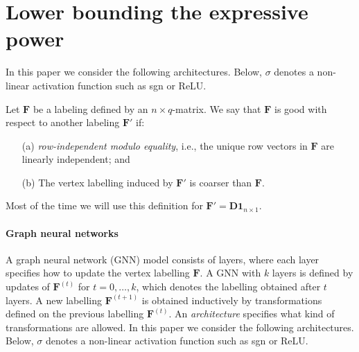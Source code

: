 


\newpage

\section{Lower bounding the expressive power}

In this paper we consider the following architectures. Below, $\sigma$ denotes a non-linear activation function such as sgn or ReLU. 

\begin{definition}\label{def:label}
Let $\mathbf{F}$ be a labeling defined by an $n\times q$-matrix. 
We say that $\mathbf{F}$ is good with respect to another labeling $\mathbf{F}'$ if:
\begin{enumerate}
\item[(a)] \textit{row-independent modulo equality}, i.e., the unique row vectors in $\mathbf{F}$ are linearly independent; and
\item[(b)] 
The vertex labelling induced by $\mathbf{F}'$ is coarser than  $\mathbf{F}$.
\end{enumerate}
\end{definition}
Most of the time we will use this definition for $\mathbf{F}' = \mathbf{D} \mathbf{1}_{n \times 1}$.
\paragraph*{Graph neural networks}
A graph neural network (GNN) model consists of layers, where each layer specifies how to update the vertex labelling $\mathbf{F}$. A GNN with $k$ layers is defined by updates of $\mathbf{F}^{(t)}$ for $t = 0, \ldots,k$, which denotes the labelling obtained after $t$ layers. A new labelling $\mathbf{F}^{(t+1)}$ is obtained inductively by transformations defined on the previous labelling $\mathbf{F}^{(t)}$. An \emph{architecture} specifies what kind of transformations are allowed. In this paper we consider the following architectures. Below, $\sigma$ denotes a non-linear activation function such as sgn or ReLU. 

